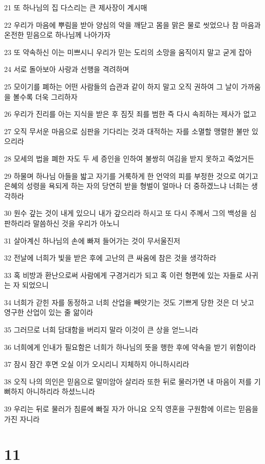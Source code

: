 \par 21 또 하나님의 집 다스리는 큰 제사장이 계시매
\par 22 우리가 마음에 뿌림을 받아 양심의 악을 깨닫고 몸을 맑은 물로 씻었으나 참 마음과 온전한 믿음으로 하나님께 나아가자
\par 23 또 약속하신 이는 미쁘시니 우리가 믿는 도리의 소망을 움직이지 말고 굳게 잡아
\par 24 서로 돌아보아 사랑과 선행을 격려하며
\par 25 모이기를 폐하는 어떤 사람들의 습관과 같이 하지 말고 오직 권하여 그 날이 가까움을 볼수록 더욱 그리하자
\par 26 우리가 진리를 아는 지식을 받은 후 짐짓 죄를 범한 즉 다시 속죄하는 제사가 없고
\par 27 오직 무서운 마음으로 심판을 기다리는 것과 대적하는 자를 소멸할 맹렬한 불만 있으리라
\par 28 모세의 법을 폐한 자도 두 세 증인을 인하여 불쌍히 여김을 받지 못하고 죽었거든
\par 29 하물며 하나님 아들을 밟고 자기를 거룩하게 한 언약의 피를 부정한 것으로 여기고 은혜의 성령을 욕되게 하는 자의 당연히 받을 형벌이 얼마나 더 중하겠느냐 너희는 생각하라
\par 30 원수 갚는 것이 내게 있으니 내가 갚으리라 하시고 또 다시 주께서 그의 백성을 심판하리라 말씀하신 것을 우리가 아노니
\par 31 살아계신 하나님의 손에 빠져 들어가는 것이 무서울진저
\par 32 전날에 너희가 빛을 받은 후에 고난의 큰 싸움에 참은 것을 생각하라
\par 33 혹 비방과 환난으로써 사람에게 구경거리가 되고 혹 이런 형편에 있는 자들로 사귀는 자 되었으니
\par 34 너희가 갇힌 자를 동정하고 너희 산업을 빼앗기는 것도 기쁘게 당한 것은 더 낫고 영구한 산업이 있는 줄 앎이라
\par 35 그러므로 너희 담대함을 버리지 말라 이것이 큰 상을 얻느니라
\par 36 너희에게 인내가 필요함은 너희가 하나님의 뜻을 행한 후에 약속을 받기 위함이라
\par 37 잠시 잠간 후면 오실 이가 오시리니 지체하지 아니하시리라
\par 38 오직 나의 의인은 믿음으로 말미암아 살리라 또한 뒤로 물러가면 내 마음이 저를 기뻐하지 아니하리라 하셨느니라
\par 39 우리는 뒤로 물러가 침륜에 빠질 자가 아니요 오직 영혼을 구원함에 이르는 믿음을 가진 자니라

\chapter{11}

